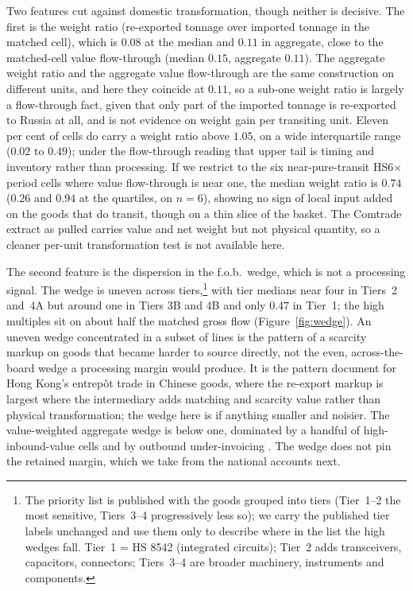 \documentclass[12pt]{article}
\begin{document}
Two features cut against domestic transformation, though neither is decisive. The first is the
weight ratio (re-exported tonnage over imported tonnage in the matched cell), which is
$0.08$ at the median and $0.11$ in aggregate, close to the matched-cell value flow-through
(median $0.15$, aggregate $0.11$). The aggregate weight ratio and the aggregate value
flow-through are the same construction on different units, and here they coincide at $0.11$, so a
sub-one weight ratio is largely a flow-through fact, given that only part of the imported
tonnage is re-exported to Russia at all, and is not evidence on weight gain per transiting
unit. Eleven per
cent of cells do carry a weight ratio above $1.05$, on a wide interquartile range ($0.02$ to
$0.49$); under the flow-through reading that upper tail is timing and inventory rather than
processing. If we restrict to the six near-pure-transit HS6$\times$period cells where value
flow-through is near one, the median weight ratio is $0.74$ ($0.26$ and $0.94$ at the
quartiles, on $n = 6$), showing no sign of local input added on the goods that do transit,
though on a thin slice of the basket. The
Comtrade extract as pulled carries value and net weight but not physical quantity, so a
cleaner per-unit transformation test is not available here.

The second feature is the dispersion in the f.o.b.\ wedge, which is not a processing signal.
The wedge is uneven across tiers,\footnote{The priority list is
published with the goods grouped into tiers (Tier~1--2 the most sensitive, Tiers~3--4
progressively less so); we carry the published tier labels unchanged and use them only to
describe where in the list the high wedges fall. Tier~1 = HS 8542 (integrated circuits);
Tier~2 adds transceivers, capacitors, connectors; Tiers~3--4 are broader machinery,
instruments and components.} with tier medians near four in Tiers~2 and~4A but around one in
Tiers 3B and 4B and only $0.47$ in Tier~1; the high multiples sit on about half the matched
gross flow (Figure~\ref{fig:wedge}). An uneven wedge concentrated in a subset of lines is the
pattern of a scarcity markup on goods that became harder to source directly, not the even,
across-the-board wedge a processing margin would produce. It is the pattern
\citet{feenstrahanson2004entrepot} document for Hong Kong's entrep\^ot trade in Chinese goods,
where the re-export markup is largest where the intermediary adds matching and
scarcity value rather than physical transformation; the wedge here is if anything smaller and
noisier. The value-weighted aggregate wedge is below one, dominated by a handful of
high-inbound-value cells and by outbound under-invoicing \citep{fisman2004missing}. The wedge
does not pin the retained margin, which we take from the national accounts next.
\end{document}
